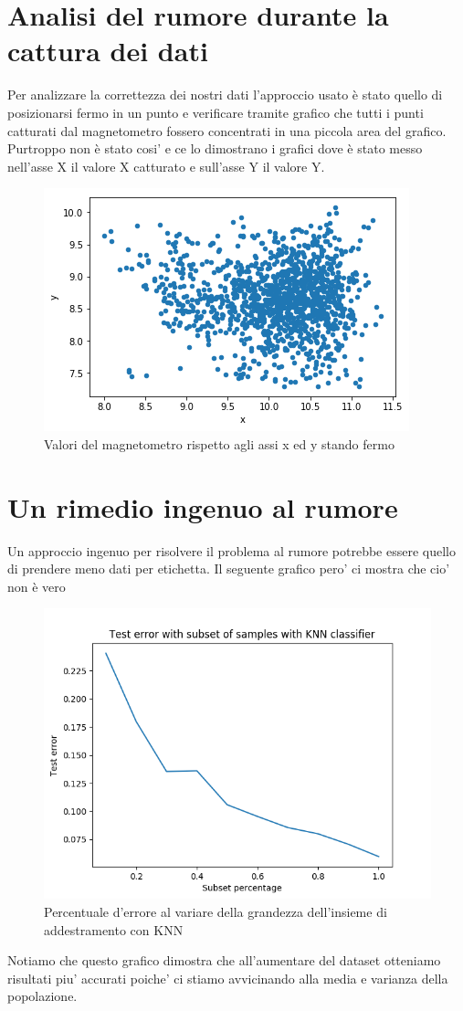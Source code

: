 \section{Analisi del rumore durante la cattura dei dati}
Per analizzare la correttezza dei nostri dati l'approccio usato \`e stato quello di posizionarsi fermo in un punto e verificare tramite grafico che tutti i punti catturati dal magnetometro fossero concentrati in una piccola area del grafico. Purtroppo non \`e stato cosi' e ce lo dimostrano i grafici dove \`e stato messo nell'asse X il valore X catturato e sull'asse Y il valore Y.

\begin{figure}[H]
	\centering
	\includegraphics[width=0.7\linewidth]{img/xystand}
	\caption{Valori del magnetometro rispetto agli assi x ed y stando fermo}
	\label{fig:xystand}
\end{figure}



\section{Un rimedio ingenuo al rumore}
Un approccio ingenuo per risolvere il problema al rumore potrebbe essere quello di prendere meno dati per etichetta. Il seguente grafico pero' ci mostra che cio' non \`e vero

\begin{figure}[H]
	\centering
	\includegraphics[width=0.7\linewidth]{img/rumor_graph_knn}
	\caption{Percentuale d'errore al variare della grandezza dell'insieme di addestramento con KNN}
	\label{fig:rumorgraphknn}
\end{figure}

Notiamo che questo grafico dimostra che all'aumentare del dataset otteniamo risultati piu' accurati poiche' ci stiamo avvicinando alla media e varianza della popolazione.


